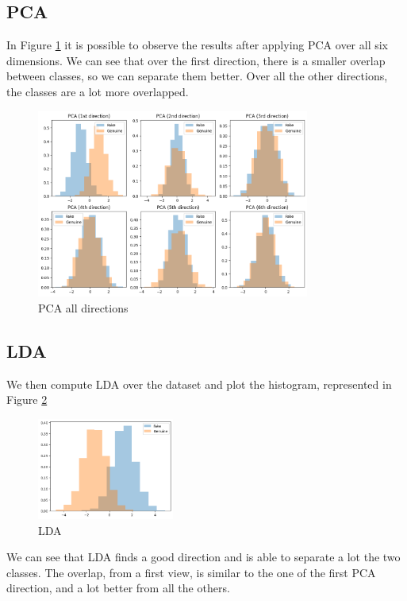 \documentclass[12pt, a4paper]{article}
\begin{document}
\subsection{PCA}

In Figure \ref{fig:PCA_6_dir} it is possible to observe the results after applying PCA over all six dimensions. We can see that over the first direction, there is a smaller overlap between classes, so we can separate them better. Over all the other directions, the classes are a lot more overlapped.

\begin{figure}[ht]
	\centering
	\includegraphics[width=0.8\textwidth]{PCA_6_directions}
	\caption{PCA all directions}
	\label{fig:PCA_6_dir}
\end{figure}

\subsection{LDA}

We then compute LDA over the dataset and plot the histogram, represented in Figure \ref{fig:LDA_1_dir}

\begin{figure}[ht]
	\centering
	\includegraphics[width=0.4\textwidth]{LDA_1_direction}
	\caption{LDA}
	\label{fig:LDA_1_dir}
\end{figure}

We can see that LDA finds a good direction and is able to separate a lot the two classes. The overlap, from a first view, is similar to the one of the first PCA direction, and a lot better from all the others.
\end{document}
